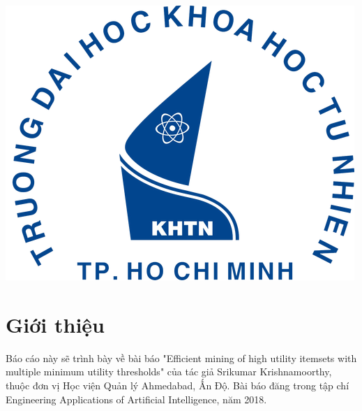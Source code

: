 \begin{titlepage}




\includegraphics{logo/rsz_3logo-khtn.png}\\[1cm] %
 

\vfill %

\end{titlepage}


\section{Giới thiệu}
Báo cáo này sẽ trình bày về bài báo "Efficient mining of high utility itemsets with multiple minimum utility thresholds" \cite{krishnamoorthy2018efficient} của tác giả Srikumar Krishnamoorthy, thuộc đơn vị Học viện Quản lý Ahmedabad, Ấn Độ. Bài báo đăng trong tập chí Engineering Applications of Artificial Intelligence, năm 2018. 

